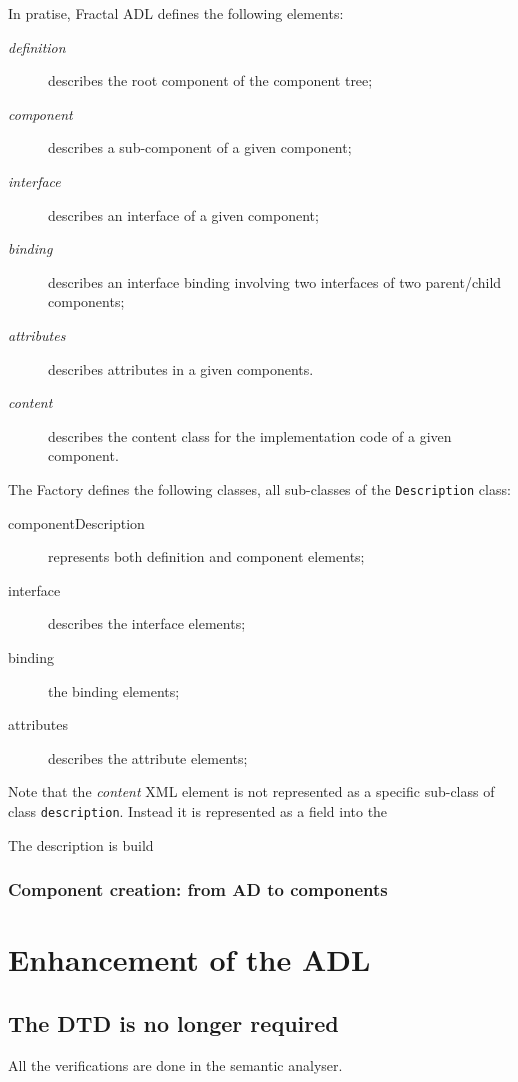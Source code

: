 \documentclass{article}
\newcommand{\code}[1]{\texttt{#1}}
\newcommand{\xml}[1]{\textsl{#1}}
\begin{document}
In pratise, Fractal ADL  defines the following elements:
\begin{description}
\item[\xml{definition}] describes the root component of the component tree;
\item[\xml{component}] describes a sub-component of a given component;
\item[\xml{interface}] describes an interface of a given component;
\item[\xml{binding}] describes an interface binding involving two interfaces of two parent/child components;
\item[\xml{attributes}] describes attributes in a given components.
\item[\xml{content}] describes the content class for the implementation code of a given component.
\end{description}
The Factory  defines the following classes, all sub-classes of the \code{Description} class:
\begin{description}
\item[componentDescription] represents both definition and component elements;
\item[interface] describes the interface elements;
\item[binding] the binding elements;
\item[attributes] describes the attribute elements;
\end{description}

Note that the \xml{content} XML element is not represented as a specific sub-class of class \code{description}.
Instead it is represented as a field into the 

The description is build 

\subsubsection{Component creation: from AD to components}



\section{Enhancement of the ADL}

\subsection{The DTD is no longer required}

All the verifications are done in the semantic analyser.
\end{document}
